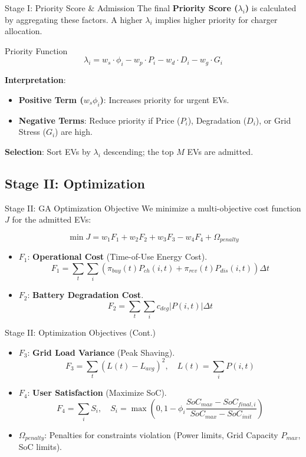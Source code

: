 \documentclass{beamer}
\begin{document}
\begin{frame}{Stage I: Priority Score \& Admission}
  The final \textbf{Priority Score ($\lambda_i$)} is calculated by aggregating these factors. A higher $\lambda_i$ implies higher priority for charger allocation.
  
  \begin{block}{Priority Function}
  $$ \lambda_i = w_s \cdot \phi_i - w_p \cdot P_i - w_d \cdot D_i - w_g \cdot G_i $$
  \end{block}

  \textbf{Interpretation}:
  \begin{itemize}
      \item \textbf{Positive Term ($w_s \phi_i$)}: Increases priority for urgent EVs.
      \item \textbf{Negative Terms}: Reduce priority if Price ($P_i$), Degradation ($D_i$), or Grid Stress ($G_i$) are high.
  \end{itemize}

  \textbf{Selection}: Sort EVs by $\lambda_i$ descending; the top $M$ EVs are admitted.
\end{frame}

\subsection{Stage II: Optimization}
\begin{frame}{Stage II: GA Optimization Objective}
  We minimize a multi-objective cost function $J$ for the admitted EVs:
  
  $$ \min J = w_1 F_1 + w_2 F_2 + w_3 F_3 - w_4 F_4 + \Omega_{penalty} $$
  
  \begin{itemize}
      \item $F_1$: \textbf{Operational Cost} (Time-of-Use Energy Cost).
      $$ F_1 = \sum_{t} \sum_{i} \left( \pi_{buy}(t) P_{ch}(i,t) + \pi_{rev}(t) P_{dis}(i,t) \right) \Delta t $$
      \item $F_2$: \textbf{Battery Degradation Cost}.
      $$ F_2 = \sum_{t} \sum_{i} c_{deg} |P(i,t)| \Delta t $$
  \end{itemize}
\end{frame}

\begin{frame}{Stage II: Optimization Objectives (Cont.)}
  \begin{itemize}
      \item $F_3$: \textbf{Grid Load Variance} (Peak Shaving).
      $$ F_3 = \sum_{t} \left( L(t) - L_{avg} \right)^2, \quad L(t) = \sum_i P(i,t) $$
      \item $F_4$: \textbf{User Satisfaction} (Maximize SoC).
      $$ F_4 = \sum_{i} S_i, \quad S_i = \max\left(0, 1 - \phi_i \frac{SoC_{max} - SoC_{final,i}}{SoC_{max} - SoC_{init}}\right) $$
      \item $\Omega_{penalty}$: Penalties for constraints violation (Power limits, Grid Capacity $P_{max}$, SoC limits).
  \end{itemize}
\end{frame}
\end{document}
